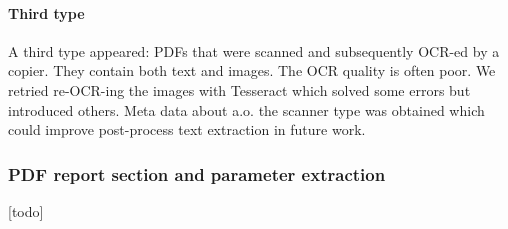 \paragraph{Third type}
A third type appeared: PDFs that were scanned and subsequently OCR-ed by a copier. They contain both text and images. The OCR quality is often poor. We retried re-OCR-ing the images with Tesseract which solved some errors but introduced others. Meta data about a.o. the scanner type was obtained which could improve post-process text extraction in future work.


\subsubsection{PDF report section and parameter extraction}
[todo]




